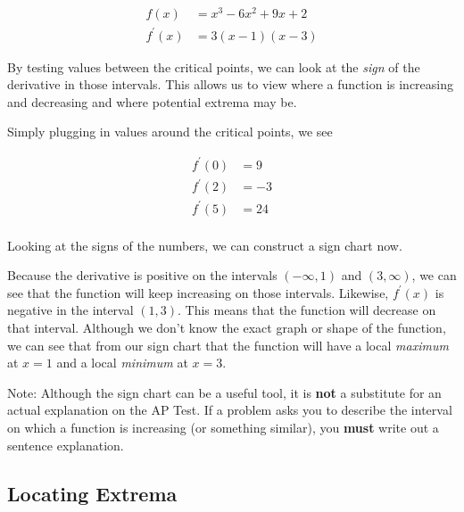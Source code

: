 \begin{align*}
    f \left( x \right) &= x^3 - 6x^2 + 9x + 2 \\
    f^\prime \left( x \right) &= 3 \left( x - 1 \right) \left( x - 3 \right)
\end{align*}
    
By testing values between the critical points, we can look at the \textit{sign} of the derivative in those intervals. This allows us to view where a function is increasing and decreasing and where potential extrema may be.
    
Simply plugging in values around the critical points, we see
    
\begin{align*}
    f^\prime \left( 0 \right) &= 9 \\
    f^\prime \left( 2 \right) &= -3 \\
    f^\prime \left( 5 \right) &= 24 \\
\end{align*}
    
Looking at the signs of the numbers, we can construct a sign chart now.
    
\begin{figure}[H]
    \centering
    
\end{figure}
    
Because the derivative is positive on the intervals \( \left( -\infty, 1 \right) \) and \( \left( 3, \infty \right) \), we can see that the function will keep increasing on those intervals. Likewise, \( f^\prime \left( x \right) \) is negative in the interval \( \left(1, 3 \right) \). This means that the function will decrease on that interval. Although we don't know the exact graph or shape of the function, we can see that from our sign chart that the function will have a local \textit{maximum} at \( x = 1 \) and a local \textit{minimum} at \( x = 3 \).

\begin{tip}
    Note: Although the sign chart can be a useful tool, it is \textbf{not} a substitute for an actual explanation on the AP Test. If a problem asks you to describe the interval on which a function is increasing (or something similar), you \textbf{must} write out a sentence explanation.
\end{tip}

\subsection{Locating Extrema}

